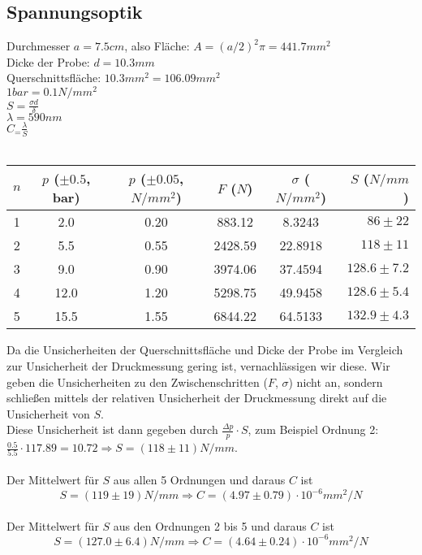 \documentclass{article}
\begin{document}
\subsection{Spannungsoptik}
Durchmesser $a=7.5cm$, also Fläche: $A=(a/2)^2\pi=441.7mm^2$\\
Dicke der Probe: $d=10.3mm$\\
Querschnittsfläche: $10.3mm^2=106.09mm^2$\\
$1 bar = 0.1 N/mm^2$\\
$S=\frac{\sigma d}{\delta}$\\
$\lambda=590nm$\\
$C_=\frac{\lambda}{S}$\\
\\
\begin{table}[H]
\begin{center}
\begin{tabular}{|c|c|c|c|c|r|}
\hline
$n$ & $p$ ($\pm 0.5$, bar) & $p$ ($\pm 0.05$, $\si{N/mm^2}$) & $F$ ($N$) & $\sigma$ ($\si{N/mm^2}$) & $S$ ($\si{N/mm}$)\\
\hline
1 & 2.0 & 0.20 & 883.12 & 8.3243 & $86 \pm 22$\\
2 & 5.5 & 0.55 & 2428.59 & 22.8918 & $118 \pm 11$\\
3 & 9.0 & 0.90 & 3974.06 & 37.4594 & $128.6 \pm 7.2$\\
4 & 12.0 & 1.20 & 5298.75 & 49.9458 & $128.6 \pm 5.4$\\
5 & 15.5 & 1.55 & 6844.22 & 64.5133 & $132.9 \pm 4.3$\\
\hline
\end{tabular}
\end{center}
\end{table}
\vspace{0.5mm}

Da die Unsicherheiten der Querschnittsfläche und Dicke der Probe im Vergleich zur Unsicherheit der Druckmessung gering ist, vernachlässigen wir diese. Wir geben die Unsicherheiten zu den Zwischenschritten ($F$, $\sigma$) nicht an, sondern schließen mittels der relativen Unsicherheit der Druckmessung direkt auf die Unsicherheit von $S$.\\
Diese Unsicherheit ist dann gegeben durch $\frac{\Delta p}{p} \cdot S$, zum Beispiel Ordnung 2: $\frac{0.5}{5.5} \cdot 117.89=10.72 \Rightarrow S=(118 \pm 11) \si{N/mm}$.\\
\\
Der Mittelwert für $S$ aus allen 5 Ordnungen und daraus $C$ ist
$$S=(119 \pm 19)\si{N/mm} \Rightarrow C=(4.97 \pm 0.79) \cdot 10^{-6}\si{mm^2/N}$$
\\
Der Mittelwert für $S$ aus den Ordnungen 2 bis 5 und daraus $C$ ist
$$\boxed{S=(127.0 \pm 6.4)\si{N/mm} \Rightarrow C=(4.64 \pm 0.24) \cdot 10^{-6}\si{mm^2/N}}$$
\end{document}
